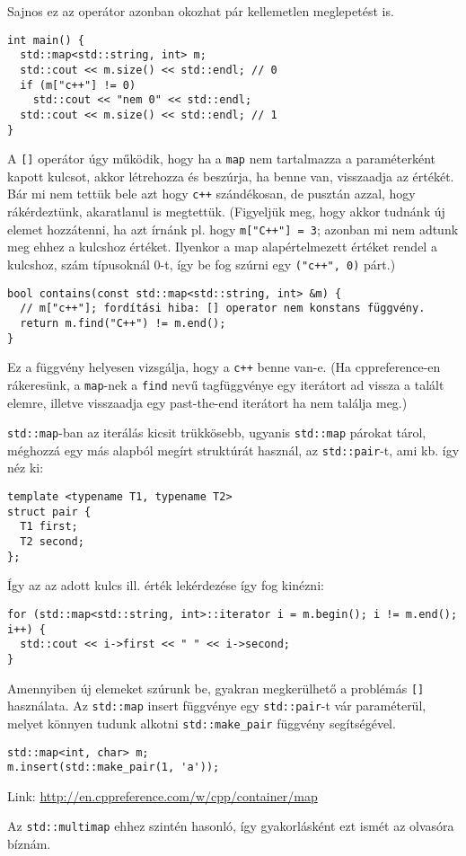 \documentclass[../cpp_book/cpp_book.tex]{subfiles}
\begin{document}
	\medskip
	Sajnos ez az operátor azonban okozhat pár kellemetlen meglepetést is.
	\begin{lstlisting}
int main() {
  std::map<std::string, int> m;
  std::cout << m.size() << std::endl; // 0
  if (m["c++"] != 0)
    std::cout << "nem 0" << std::endl;
  std::cout << m.size() << std::endl; // 1
}
	\end{lstlisting}
	A \texttt{[]} operátor úgy működik, hogy ha a \texttt{map} nem tartalmazza a paraméterként kapott kulcsot, akkor létrehozza és beszúrja, ha benne van, visszaadja az értékét. Bár mi nem tettük bele azt hogy \texttt{c++} szándékosan, de pusztán azzal, hogy rákérdeztünk, akaratlanul is megtettük. (Figyeljük meg, hogy akkor tudnánk új elemet hozzátenni, ha azt írnánk pl. hogy \texttt{m["C++"] = 3}; azonban mi nem adtunk meg ehhez a kulcshoz értéket. Ilyenkor a map alapértelmezett értéket rendel a kulcshoz, szám típusoknál 0-t, így be fog szúrni egy \texttt{("c++", 0)} párt.)
	\begin{lstlisting}
bool contains(const std::map<std::string, int> &m) {
  // m["c++"]; fordítási hiba: [] operator nem konstans függvény.
  return m.find("C++") != m.end();
}
	\end{lstlisting}
	Ez a függvény helyesen vizsgálja, hogy a \texttt{c++} benne van-e. (Ha cppreference-en rákeresünk, a \texttt{map}-nek a \texttt{find} nevű tagfüggvénye egy iterátort ad vissza a talált elemre, illetve visszaadja egy past-the-end iterátort ha nem találja meg.)
	\medskip
	
	
	\texttt{std::map}-ban az iterálás kicsit trükkösebb, ugyanis \texttt{std::map} párokat tárol, méghozzá egy más alapból megírt struktúrát használ, az \texttt{std::pair}-t, ami kb. így néz ki:
	\begin{lstlisting}
template <typename T1, typename T2>
struct pair {
  T1 first;
  T2 second;
};
	\end{lstlisting}
	Így az az adott kulcs ill. érték lekérdezése így fog kinézni:
	\begin{lstlisting}
for (std::map<std::string, int>::iterator i = m.begin(); i != m.end(); i++) {
  std::cout << i->first << " " << i->second;
}
	\end{lstlisting}
	Amennyiben új elemeket szúrunk be, gyakran megkerülhető a problémás \texttt{[]} használata. Az \texttt{std::map} insert függvénye egy \texttt{std::pair}-t vár paraméterül, melyet könnyen tudunk alkotni \texttt{std::make\_pair} függvény segítségével.
	\begin{lstlisting}
std::map<int, char> m;
m.insert(std::make_pair(1, 'a'));
	\end{lstlisting}
	
	Link: \url{http://en.cppreference.com/w/cpp/container/map}
	\begin{note}
		Az \texttt{std::multimap} ehhez szintén hasonló, így gyakorlásként ezt ismét az olvasóra bíznám.
	\end{note}
\end{document}
